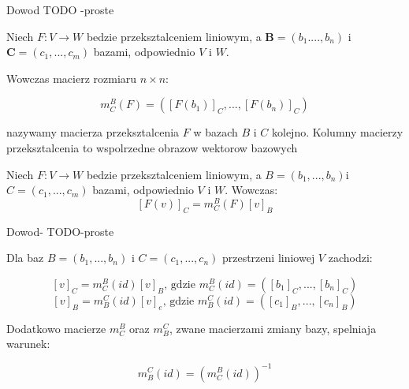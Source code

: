 \documentclass{article}
\begin{document}
Dowod TODO -proste

\vspace{5mm}

\begin{tcolorbox}[colback=white!90!red,colframe=black!35!red,title=Definicja 1.27 Macierz przeksztalcenia]

Niech $F: V \rightarrow W$ bedzie przeksztalceniem liniowym, a $\mathbf{B} = (b_{1}...., b_{n})$ i $\mathbf{C} = (c_{1},..., c_{m})$ bazami, odpowiednio $V$ i $W$. 

Wowczas macierz rozmiaru $n \times n$:

$$m_{C}^{B}(F) = ([F(b_{1})]_{C},...,[F(b_{n})]_{C})$$

nazywamy macierza przeksztalcenia $F$ w bazach $B$ i $C$ kolejno. Kolumny macierzy przeksztalcenia to wspolrzedne obrazow wektorow bazowych

\end{tcolorbox}

\vspace{5mm}

\begin{tcolorbox}[colback=white!90!red,colframe=black!35!red,title=Fakt 1.28 Macierz przeksztalcenia]

Niech $F: V \rightarrow W$ bedzie przeksztalceniem liniowym, a $B=(b_{1},...,b_{n})$i $C=(c_{1},...,c_{m})$ bazami, odpowiednio $V$ i $W$. Wowczas:
$$[F(v)]_{C} = m_{C}^{B}(F)[v]_{B}$$

\end{tcolorbox}

\vspace{5mm}

Dowod- TODO-proste
\vspace{5mm}


\begin{tcolorbox}[colback=white!90!red,colframe=black!35!red,title=Wniosek 1.29]

Dla baz $B = (b_{1},...,b_{n})$ i $C = (c_{1},...,c_{n})$ przestrzeni liniowej $V$ zachodzi:

$$[v]_{C} = m_{C}^{B}(id)[v]_{B} \text{, gdzie } m_{C}^{B}(id) = ([b_{1}]_{C},...,[b_{n}]_{C})$$
$$[v]_{B} = m_{B}^{C}(id)[v]_{e} \text{, gdzie } m_{B}^{C}(id) = ([c_{1}]_{B},...,[c_{n}]_{B})$$

Dodatkowo macierze $m_{C}^{B}$ oraz $m_{B}^{C}$, zwane macierzami zmiany bazy, spelniaja warunek:

$$m_{B}^{C}(id) = (m_{C}^{B}(id))^{-1}$$

\end{tcolorbox}
\vspace{5mm}
\end{document}
